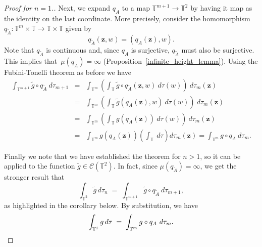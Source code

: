 \documentclass[10pt,a4paper]{amsart}
\newcommand{\mb}{\mathbf}
\newcommand{\mc}{\mathcal}
\newcommand{\torus}{{\mathbb{T}}}
\begin{document}
\begin{proof}[Proof for $n=1$.]
Next, we expand $q_A$ to a map $\torus^{m+1} \to \torus^2$ by having it map as the identity on the last coordinate. More precisely,
consider the homomorphism $q_{\tilde A} \colon \torus^m \times \torus \to \torus \times \torus$ given by
$$
q_{\tilde A} (\mb z, w) = \left( q_A(\mb z), w \right).
$$
Note that $q_{\tilde A}$ is continuous and,
since $q_A$ is surjective, $q_{\tilde A}$ must also be surjective.  This implies that~$\mu\left( q_{\tilde A} \right) = \infty$ (Proposition~\ref{infinite_height_lemma}).
Using the  Fubini-Tonelli theorem as before we have
\begin{eqnarray*}
\int_{\torus^{m+1}} \tilde g \circ q_{\tilde A} \ d\tau_{m+1} 
&=& \int_{\torus^m} \left(  \int_{\torus} \tilde g \circ q_{\tilde A} (\mb z, w) \ d\tau (w) \right) \ d\tau_{m} (\mb z) \\
&=& \int_{\torus^m} \left(  \int_{\torus} \tilde g  \left(q_A(\mb z), w\right) \ d\tau (w) \right) \ d\tau_{m} (\mb z) \\
&=& \int_{\torus^m} \left(  \int_{\torus} g  \left(q_A(\mb z)\right) \ d\tau (w) \right) \ d\tau_{m} (\mb z) \\
&=& \int_{\torus^m} g  \left(q_A(\mb z)\right)  \left( \int_{\torus}  \ d\tau \right) d\tau_m  (\mb z)   = \int_{\torus^m} g \circ q_A \ d\tau_m.
\end{eqnarray*}

Finally we note that we have established the theorem for $n>1$, so it can be applied to the function $\tilde g \in \mc C(\torus^2)$.
In fact, since   $\mu\left( q_{\tilde A} \right) = \infty$, we get the stronger result that
$$
 \int_{\torus^{2}} \tilde g \, d \tau_{n}
 \;  = \; 
\int_{\torus^{m+1}} \tilde g \circ q_{\tilde A} \ d \tau_{m+1},
$$
as highlighted in the corollary below.
By substitution, we have
\[
 \int_{\torus^{1}} g \, d \tau
 \;  = \; 
\int_{\torus^{m}} g \circ q_{A} \ d \tau_{m}. \qedhere\]
\end{proof} 
\end{document}
